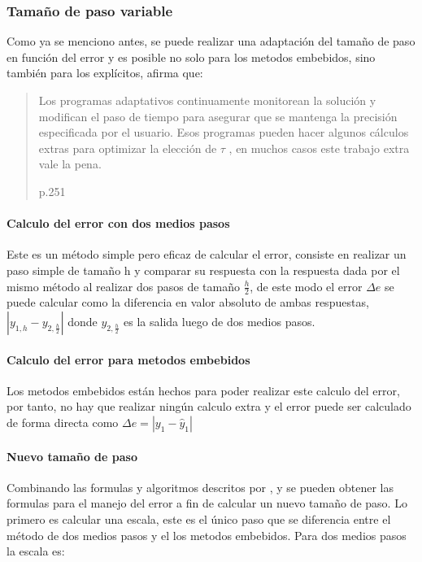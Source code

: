         \subsubsection{Tamaño de paso variable}

            Como ya se menciono antes, se puede realizar una adaptación del tamaño de paso en función del error y es posible no solo para los metodos embebidos, sino también para los explícitos, \textcite{roganprogramacion} afirma que: \blockquote[p.251]{Los programas adaptativos continuamente monitorean la solución y modifican el paso de
            tiempo para asegurar que se mantenga la precisión especificada por el usuario. Esos programas
            pueden hacer algunos cálculos extras para optimizar la elección de $\tau$ , en muchos casos este
            trabajo extra vale la pena.}
            
            \paragraph{Calculo del error con dos medios pasos}

                Este es un método simple pero eficaz de calcular el error, consiste en realizar un paso simple de tamaño h y comparar su respuesta con la respuesta dada por el mismo método al realizar dos pasos de tamaño $\frac{h}{2}$, de este modo el error $\Delta e$ se puede calcular como la diferencia en valor absoluto de ambas respuestas, $\left|y_{1,h} - y_{2,\frac{h}{2}}\right|$ donde $y_{2,\frac{h}{2}}$ es la salida luego de dos medios pasos.
            
            \paragraph{Calculo del error para metodos embebidos} 

                Los metodos embebidos están hechos para poder realizar este calculo del error, por tanto, no hay que realizar ningún calculo extra y el error puede ser calculado de forma directa como $\Delta e = \left| y_1 - \hat{y}_1\right|$

            \paragraph{Nuevo tamaño de paso}

                Combinando las formulas y algoritmos descritos por \textcite{roganprogramacion}, \textcite{hairer1991solving} y \textcite{ritschel2013numerical} se pueden obtener las formulas para el manejo del error a fin de calcular un nuevo tamaño de paso. Lo primero es calcular una escala, este es el único paso que se diferencia entre el método de dos medios pasos y el los metodos embebidos. Para dos medios pasos la escala es:


